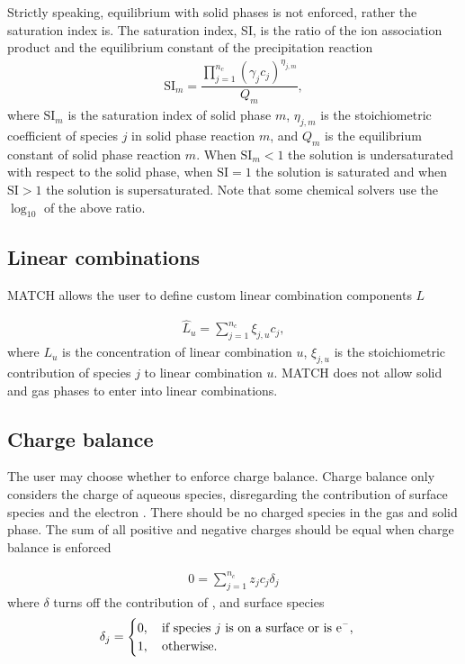 \documentclass{article}
\begin{document}
Strictly speaking, equilibrium with solid phases is not enforced, rather the saturation index is. The saturation index, SI, is the ratio of the ion association product and the equilibrium constant of the precipitation reaction
\begin{align}
\text{SI}_m = \dfrac{\prod_{j=1}^{n_c} \left(\gamma_j c_j\right)^{\eta_{j,m}}}{Q_m},
\end{align}
where $\text{SI}_m$ is the saturation index of solid phase $m$, $\eta_{j,m}$ is the stoichiometric coefficient of species $j$ in solid phase reaction $m$, and $Q_m$ is the equilibrium constant of solid phase reaction $m$. When $\text{SI}_m<1$ the solution is undersaturated with respect to the solid phase, when $\text{SI}=1$ the solution is saturated and when $\text{SI}>1$ the solution is supersaturated. Note that some chemical solvers use the $\log_{10}$ of the above ratio. 

\subsection{Linear combinations}
MATCH allows the user to define custom linear combination components $L$

\begin{align}
    \hat{L}_u = \sum_{j=1}^{n_c} \xi_{j,u} c_j, %
\end{align}
where $L_u$ is the concentration of linear combination $u$, $\xi_{j,u}$ is the stoichiometric contribution of species $j$ to linear combination $u$. MATCH does not allow solid and gas phases to enter into linear combinations.

\subsection{Charge balance}
The user may choose whether to enforce charge balance. Charge balance only considers the charge of aqueous species, disregarding the contribution of surface species and the electron . There should be no charged species in the gas and solid phase. The sum of all positive and negative charges should be equal when charge balance is enforced

\begin{align}
    0 = \sum_{j=1}^{n_c} z_j c_j \delta_j
\end{align}
where $\delta$ turns off the contribution of , and surface species
\begin{align}
\delta_j = \begin{cases}
0, \quad\text{if species $j$ is on a surface or is \ce{e-}},\\
1, \quad\text{otherwise}.
\end{cases}
\end{align}
\end{document}
